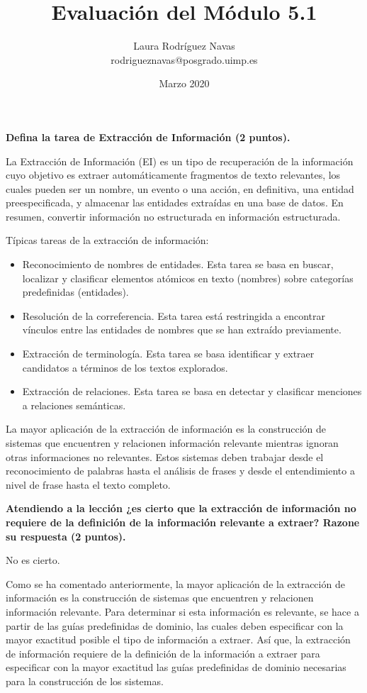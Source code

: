 \documentclass[11pt]{exam}
\title{Evaluación del Módulo 5.1}
\author{Laura Rodríguez Navas \\ rodrigueznavas@posgrado.uimp.es}
\date{Marzo 2020}
\begin{document}
	
\maketitle

\begin{questions}
	
{\bf \question Defina la tarea de Extracción de Información (2 puntos).}

La Extracción de Información (EI) es un tipo de recuperación de la información cuyo objetivo es extraer automáticamente fragmentos de texto relevantes, los cuales pueden ser un nombre, un evento o una acción, en definitiva, una entidad preespecificada, y almacenar las entidades extraídas en una base de datos. En resumen, convertir información no estructurada en información estructurada. 

Típicas tareas de la extracción de información:

\begin{itemize}
	\item Reconocimiento de nombres de entidades. Esta tarea se basa en buscar, localizar y clasificar elementos atómicos en texto (nombres) sobre categorías predefinidas (entidades). 
	\item Resolución de la correferencia. Esta tarea está restringida a encontrar vínculos entre las entidades de nombres que se han extraído previamente.
	\item Extracción de terminología. Esta tarea se basa identificar y extraer candidatos a términos de los textos explorados.
	\item Extracción de relaciones. Esta tarea se basa en detectar y clasificar menciones a relaciones semánticas.
\end{itemize}

La mayor aplicación de la extracción de información es la construcción de sistemas que encuentren y relacionen información relevante mientras ignoran otras informaciones no relevantes. Estos sistemas deben trabajar desde el reconocimiento de palabras hasta el análisis de frases y desde el entendimiento a nivel de frase hasta el texto completo.

{\bf \question Atendiendo a la lección ¿es cierto que la extracción de información no requiere de la definición de la información relevante a extraer? Razone su respuesta (2 puntos).}

No es cierto. 

Como se ha comentado anteriormente, la mayor aplicación de la extracción de información es la construcción de sistemas que encuentren y relacionen información relevante. Para determinar si esta información es relevante, se hace a partir de las guías predefinidas de dominio, las cuales deben especificar con la mayor exactitud posible el tipo de información a extraer. Así que, la extracción de información requiere de la definición de la información a extraer para especificar con la mayor exactitud las guías predefinidas de dominio necesarias para la construcción de los sistemas.


\end{questions}
\end{document}
